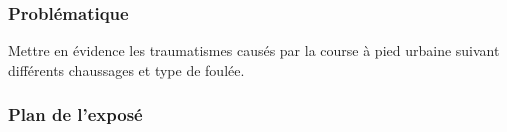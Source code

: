 \begin{frame}
\titlepage
\end{frame}

\begin{frame}
\frametitle{Problématique}
Mettre en évidence les traumatismes causés par la course à pied urbaine suivant différents chaussages et type de foulée.
\end{frame}

\begin{frame}
\frametitle{Plan de l'exposé}
\tableofcontents
\end{frame}
